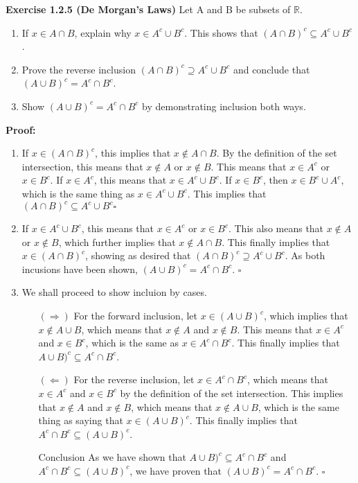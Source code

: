 \documentclass[12 pt]{article}
\newcommand{\qed}[0]{$\square$}
\begin{document}
 
\textbf{Exercise 1.2.5 (De Morgan's Laws)} Let A and B be subsets of \(\mathbb{R}\).

\begin{enumerate}
\item If \(x \in A \cap B\), explain why \(x \in A^c \cup B^c\). This shows that \((A \cap B)^c \subseteq A^c \cup B^c\).
\item Prove the reverse inclusion \((A \cap B)^c \supseteq A^c \cup B^c\) and conclude that \((A \cup B)^c = A^c \cap B^c\).
\item Show \((A \cup B)^c = A^c \cap B^c\) by demonstrating inclusion both ways.
\end{enumerate}

\vspace{5mm}
\textbf{Proof:}
\begin{enumerate}
\item If \(x \in (A \cap B)^c\), this implies that \(x \not \in A \cap B\). By the definition of the set intersection, this means that \(x \not \in A\) or \(x \not \in B\). This means that \(x \in A^c\) or \(x \in B^c\). If \(x \in A^c\), this means that \(x \in A^c \cup B^c\). If \(x \in B^c\), then \(x \in B^c \cup A^c\), which is the same thing as \(x \in  A^c \cup B^c\). This implies that \((A \cap B)^c \subseteq A^c \cup B^c \)\qed

\item If $x \in A^c \cup B^c$, this means that $x \in A^c$ or $x \in B^c$. This also means that $x \not \in  A$ or $x \not \in B$, which further implies that $x \not \in A \cap B$. This finally implies that $x \in (A \cap B)^c$, showing as desired that \((A \cap B)^c \supseteq A^c \cup B^c\). As both incusions have been shown, \((A \cup B)^c = A^c \cap B^c\). \qed

\item We shall proceed to show incluion by cases.
\begin{enumerate}
\item[\((\Rightarrow)\)] For the forward inclusion, let \(x \in (A \cup B)^c\), which implies that \(x \not \in A \cup B\), which means that \(x \not \in A\) and \(x \not \in B\). This means that \(x \in A^c\) and \(x \in B^c\), which is the same as \(x \in A^c \cap B^c\). This finally implies that \(A \cup B)^{c} \subseteq A^{c} \cap B^{c}\).

\item[\((\Leftarrow)\)] For the reverse inclusion, let \(x \in A^c \cap B^c\), which means that \(x \in A^c\) and \(x \in B^c\) by the definition of the set intersection. This implies that \(x \not \in A\) and \(x \not \in B\), which means that \(x \not \in A \cup B\), which is the same thing as saying that \(x \in (A \cup B)^c\). This finally implies that \(A^{c} \cap B^{c} \subseteq (A \cup B)^{c}\).
\item[Conclusion] As we have shown that \(A \cup B)^{c} \subseteq A^{c} \cap B^{c}\) and \(A^{c} \cap B^{c} \subseteq (A \cup B)^{c}\), we have proven that \((A \cup B)^c = A^c \cap B^c\). \qed
\end{enumerate}
\end{enumerate}
\end{document}
